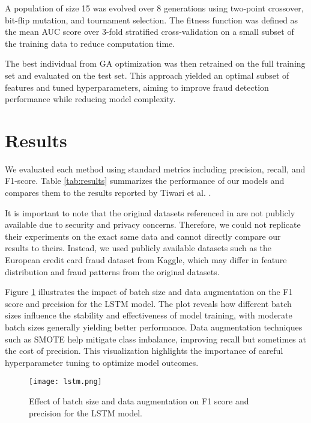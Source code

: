 \documentclass{article}
\begin{document}
A population of size 15 was evolved over 8 generations using two-point crossover, bit-flip mutation, and tournament selection. The fitness function was defined as the mean AUC score over 3-fold stratified cross-validation on a small subset of the training data to reduce computation time. 

The best individual from GA optimization was then retrained on the full training set and evaluated on the test set. This approach yielded an optimal subset of features and tuned hyperparameters, aiming to improve fraud detection performance while reducing model complexity.





\section{Results}

We evaluated each method using standard metrics including precision, recall, and F1-score. Table \ref{tab:results} summarizes the performance of our models and compares them to the results reported by Tiwari et al. \cite{tiwari2021credit}.

It is important to note that the original datasets referenced in \cite{tiwari2021credit} are not publicly available due to security and privacy concerns. Therefore, we could not replicate their experiments on the exact same data and cannot directly compare our results to theirs. Instead, we used publicly available datasets such as the European credit card fraud dataset from Kaggle, which may differ in feature distribution and fraud patterns from the original datasets.

Figure \ref{fig:batch_size_f1} illustrates the impact of batch size and data augmentation on the F1 score and precision for the LSTM model. The plot reveals how different batch sizes influence the stability and effectiveness of model training, with moderate batch sizes generally yielding better performance. Data augmentation techniques such as SMOTE help mitigate class imbalance, improving recall but sometimes at the cost of precision. This visualization highlights the importance of careful hyperparameter tuning to optimize model outcomes.


\begin{figure}[ht]
    \centering
    \texttt{[image: lstm.png]}
    \caption{Effect of batch size and data augmentation on F1 score and precision for the LSTM model.}
    \label{fig:batch_size_f1}
\end{figure}
\end{document}
